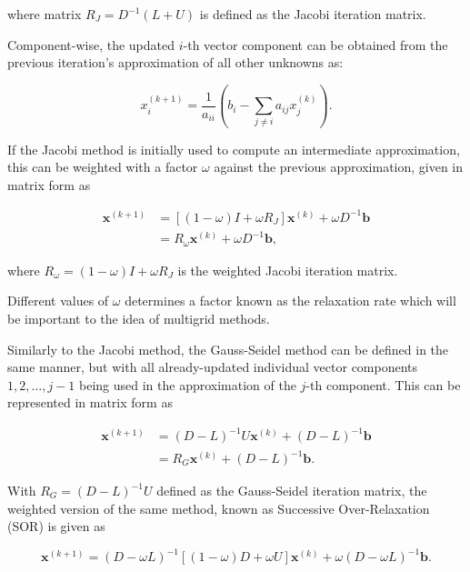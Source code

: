 where matrix $R_J = D^{-1}(L + U)$ is defined as the Jacobi iteration matrix.

Component-wise, the updated $i$-th vector component can be obtained from the previous iteration's approximation of all other unknowns as:

\begin{equation}
	x_{i}^{(k+1)} = \frac{1}{a_{ii}}\left(b_i- \sum_{j \neq i}{a_{ij}x_{j}^{(k)}} \right).
\end{equation}

If the Jacobi method is initially used to compute an intermediate approximation, this can be weighted with a factor $\omega$ against the previous approximation, given in matrix form as

\begin{equation}
	\begin{aligned}
	\mathbf{x}^{(k+1)} &= \left[ (1-\omega) I + \omega R_J \right] \mathbf{x}^{(k)} + \omega D^{-1}\mathbf{b} \\
	&= R_{\omega}\mathbf{x}^{(k)} + \omega D^{-1} \mathbf{b},
	\end{aligned}
\end{equation}

where $R_\omega = (1-\omega) I + \omega R_J$ is the weighted Jacobi iteration matrix.

Different values of $\omega$ determines a factor known as the relaxation rate which will be important to the idea of multigrid methods.

Similarly to the Jacobi method, the Gauss-Seidel method can be defined in the same manner, but with all already-updated individual vector components $1, 2, \ldots, j - 1$  being used in the approximation of the $j$-th component. This can be represented in matrix form as

\begin{equation}
	\begin{aligned}
	\mathbf{x}^{(k+1)} &= (D-L)^{-1}U\mathbf{x}^{(k)} + (D-L)^{-1}\mathbf{b} \\
                       &= R_G\mathbf{x}^{(k)} + (D-L)^{-1}\mathbf{b}.
	\end{aligned}
\end{equation}

With $R_G = (D-L)^{-1}U$ defined as the Gauss-Seidel iteration matrix, the weighted version of the same method, known as Successive Over-Relaxation (SOR) is given as

\begin{equation}
	\mathbf{x}^{(k+1)} = (D - \omega L)^{-1} \left[(1-\omega)D + \omega U \right]\mathbf{x}^{(k)} + \omega (D - \omega L)^{-1} \mathbf{b}.
\end{equation}

